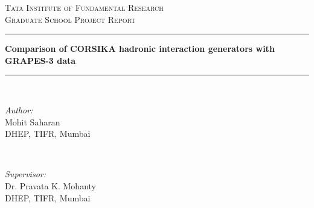 \documentclass[12pt]{article}
\begin{document}
\begin{titlepage}

\newcommand{\HRule}{\rule{\linewidth}{0.5mm}} %

\center %
 

\textsc{\LARGE Tata Institute of Fundamental Research}\\[1.5cm] 
\textsc{\large Graduate School Project Report}\\[0.5cm] %
\vspace{4cm}

\HRule
{ \huge \bfseries Comparison of CORSIKA hadronic interaction generators with GRAPES-3 data\\} %
\HRule \\[3cm]
 

\vspace{4cm}

\begin{minipage}{0.4\textwidth}
\begin{flushleft} \large
\emph{Author:}\\
Mohit Saharan\\
DHEP, TIFR, Mumbai
\end{flushleft}
\end{minipage}
~
\begin{minipage}{0.4\textwidth}
\begin{flushright} \large
\emph{Supervisor:} \\
Dr. Pravata K. Mohanty\\
DHEP, TIFR, Mumbai
\end{flushright}
\end{minipage}\\[2cm]


\end{titlepage}
\end{document}
